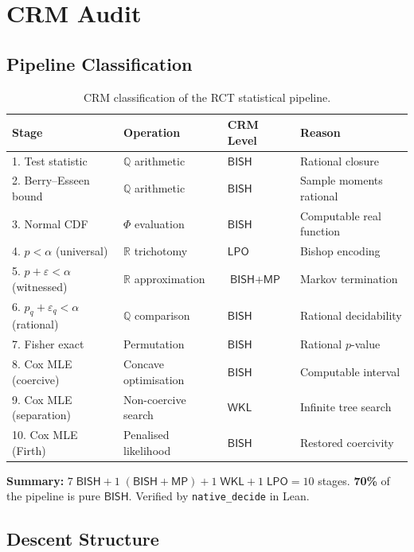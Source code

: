 \documentclass[11pt,a4paper]{article}
\theoremstyle{plain}
\theoremstyle{definition}
\newcommand{\BISH}{\textsf{BISH}}
\newcommand{\WKL}{\textsf{WKL}}
\newcommand{\LPO}{\textsf{LPO}}
\newcommand{\MP}{\textsf{MP}}
\newcommand{\Q}{\mathbb{Q}}
\newcommand{\R}{\mathbb{R}}
\renewcommand{\Phi}{\varPhi}
\begin{document}
\section{CRM Audit}\label{sec:audit}

\subsection{Pipeline Classification}

\begin{table}[ht]
\centering
\caption{CRM classification of the RCT statistical pipeline.}
\label{tab:pipeline}
\begin{tabular}{@{}llll@{}}
\toprule
\textbf{Stage} & \textbf{Operation} & \textbf{CRM Level} & \textbf{Reason} \\
\midrule
1. Test statistic         & $\Q$ arithmetic        & $\BISH$ & Rational closure \\
2. Berry--Esseen bound    & $\Q$ arithmetic        & $\BISH$ & Sample moments rational \\
3. Normal CDF             & $\Phi$ evaluation      & $\BISH$ & Computable real function \\
4. $p < \alpha$ (universal) & $\R$ trichotomy      & $\LPO$  & Bishop encoding \\
5. $p + \varepsilon < \alpha$ (witnessed) & $\R$ approximation & $\BISH + \MP$ & Markov termination \\
6. $p_q + \varepsilon_q < \alpha$ (rational) & $\Q$ comparison & $\BISH$ & Rational decidability \\
7. Fisher exact            & Permutation            & $\BISH$ & Rational $p$-value \\
8. Cox MLE (coercive)      & Concave optimisation   & $\BISH$ & Computable interval \\
9. Cox MLE (separation)    & Non-coercive search    & $\WKL$  & Infinite tree search \\
10. Cox MLE (Firth)        & Penalised likelihood   & $\BISH$ & Restored coercivity \\
\bottomrule
\end{tabular}
\end{table}

\noindent\textbf{Summary:} $7\;\BISH + 1\;(\BISH{+}\MP) + 1\;\WKL + 1\;\LPO = 10$ stages.  \textbf{70\%} of the pipeline is pure $\BISH$.  Verified by \texttt{native\_decide} in Lean.

\subsection{Descent Structure}
\end{document}
